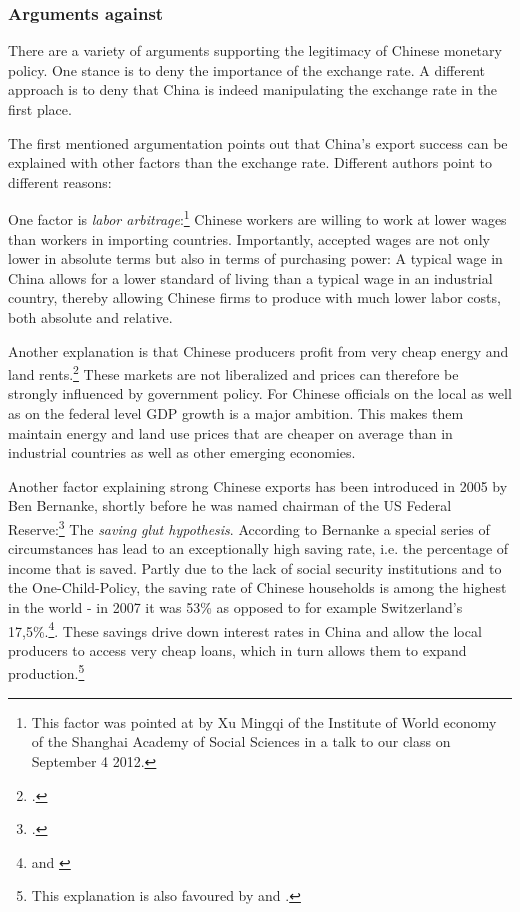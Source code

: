 \subsubsection{Arguments against}

There are a variety of arguments supporting the legitimacy of Chinese 
monetary policy.  One stance is to deny the importance of the exchange 
rate. A different approach is to deny that China is indeed manipulating 
the exchange rate in the first place.

The first mentioned argumentation points out that China's export success 
can be explained with other factors than the exchange rate.  Different 
authors point to different reasons: 

One factor is \emph{labor arbitrage}:\footnote{This factor was pointed at 
by Xu Mingqi of the Institute of World economy of the Shanghai Academy 
of Social Sciences in a talk to our class on September 4 2012.} Chinese 
workers are willing to work at lower wages than workers in importing 
countries. Importantly, accepted wages are not only lower in absolute 
terms but also in terms of purchasing power: A typical wage in China 
allows for a lower standard of living than a typical wage in an 
industrial country, thereby allowing Chinese firms to produce with much 
lower labor costs, both absolute and relative. 

Another explanation is that Chinese producers profit from very cheap energy and land 
rents.\footnote{\cite[pp.  25]{Huang2010}.} These markets are not 
liberalized and prices can therefore be strongly influenced by 
government policy. For Chinese officials on the local as well as on the 
federal level GDP growth is a major ambition. This makes them maintain 
energy and land use prices that are cheaper on average than in 
industrial countries as well as other emerging economies.

Another factor explaining strong Chinese exports has been introduced 
in 2005 by Ben Bernanke, shortly before he was named chairman of the US 
Federal Reserve:\footnote{\cite{Bernanke2005}.} The \emph{saving glut 
hypothesis}. According to Bernanke a special series of circumstances has 
lead to an exceptionally high saving rate, i.e. the percentage of income 
that is saved. Partly due to the lack of social security institutions 
and to the One-Child-Policy, the saving rate of Chinese households is 
among the highest in the world - in 2007 it was 53\% as opposed to for 
example Switzerland's 17,5\%.\footnote{\cite[pp.  20]{Yang2011} and 
\cite{BFS2012}}. These savings drive down interest rates in China and 
allow the local producers to access very cheap loans, which in turn 
allows them to expand production.\footnote{This explanation is also 
favoured by \cite[pp. 41]{Wyplosz2010} and \cite{p.  65}\cite{Reisen2010}.}

